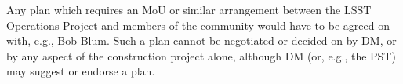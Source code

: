 \documentclass[DM,lsstdraft,toc]{lsstdoc}
\begin{document}
Any plan which requires an MoU or similar arrangement between the LSST Operations Project and members of the community would have to be agreed on with, e.g., Bob Blum.
Such a plan cannot be negotiated or decided on by DM, or by any aspect of the construction project alone, although DM (or, e.g., the PST) may suggest or endorse a plan.



\end{document}

